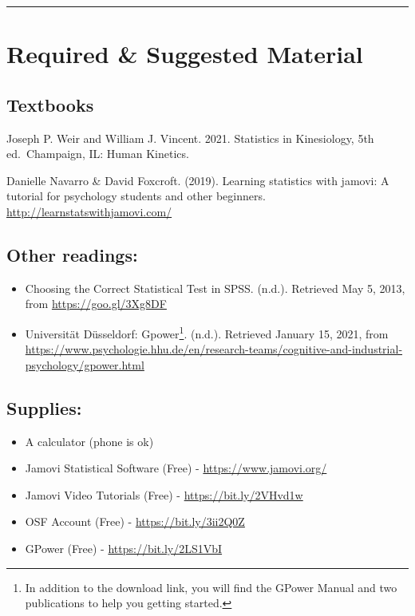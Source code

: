 \documentclass[11pt,]{article}
\providecommand{\tightlist}{%
  \setlength{\itemsep}{0pt}\setlength{\parskip}{0pt}}
\begin{document}
\begin{center}\rule{0.5\linewidth}{0.5pt}\end{center}

\hypertarget{required-suggested-material}{%
\section{Required \& Suggested
Material}\label{required-suggested-material}}

\hypertarget{textbook}{%
\subsection{Textbooks}\label{textbook}}

Joseph P. Weir and William J. Vincent. 2021. Statistics in Kinesiology,
5th ed.~Champaign, IL: Human Kinetics.

Danielle Navarro \& David Foxcroft. (2019). Learning statistics with
jamovi: A tutorial for psychology students and other beginners.
\url{http://learnstatswithjamovi.com/}

\hypertarget{other-readings}{%
\subsection{Other readings:}\label{other-readings}}

\begin{itemize}
\tightlist
\item
  Choosing the Correct Statistical Test in SPSS. (n.d.). Retrieved May
  5, 2013, from \url{https://goo.gl/3Xg8DF}
\item
  Universität Düsseldorf: Gpower\footnote{In addition to the download
    link, you will find the GPower Manual and two publications to help
    you getting started.}. (n.d.). Retrieved January 15, 2021, from
  \url{https://www.psychologie.hhu.de/en/research-teams/cognitive-and-industrial-psychology/gpower.html}
\end{itemize}

\hypertarget{supplies}{%
\subsection{Supplies:}\label{supplies}}

\begin{itemize}
\tightlist
\item
  A calculator (phone is ok)
\item
  Jamovi Statistical Software (Free) - \url{https://www.jamovi.org/}
\item
  Jamovi Video Tutorials (Free) - \url{https://bit.ly/2VHvd1w}
\item
  OSF Account (Free) - \url{https://bit.ly/3ii2Q0Z}
\item
  GPower (Free) - \url{https://bit.ly/2LS1VbI}
\end{itemize}
\end{document}
